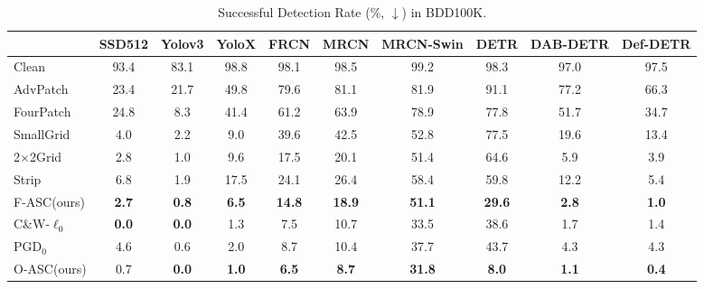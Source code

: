 \documentclass[times,twocolumn,final,authoryear]{elsarticle}
\begin{document}
\begin{table*}[!h]
\centering
\caption{Successful Detection Rate (\%, $\downarrow$) in BDD100K. 
}
\begin{tabular}{l|ccccccccc}
\hline
   & SSD512 & Yolov3 & YoloX & FRCN & MRCN & MRCN-Swin & DETR  & DAB-DETR & Def-DETR \\ \hline
Clean    
& 93.4   
& 83.1   & 98.8  & 98.1 & 98.5 & 99.2& 98.3  & 97.0  & 97.5   \\ \hline
AdvPatch 
& 23.4   & 21.7   & 49.8  & 79.6 & 81.1 & 81.9& 91.1 & 77.2   & 66.3   \\
FourPatch
& 24.8   & 8.3    & 41.4  & 61.2 & 63.9 & 78.9& 77.8 & 51.7  & 34.7     \\
SmallGrid
& 4.0    & 2.2    & 9.0   & 39.6 & 42.5 & 52.8& 77.5  & 19.6  & 13.4   \\
2$\times$2Grid 
& 2.8    & 1.0    & 9.6   & 17.5 & 20.1 & 51.4& 64.6  & 5.9 & 3.9 \\
Strip    
& 6.8    & 1.9    & 17.5  & 24.1 & 26.4 & 58.4& 59.8  & 12.2  & 5.4   \\
F-ASC(ours)    
& \textbf{2.7}    & \textbf{0.8}    & \textbf{6.5}   & \textbf{14.8} & \textbf{18.9} & \textbf{51.1} & \textbf{29.6}  & \textbf{2.8} & \textbf{1.0} \\ \hline \hline
C\&W-$\ell_0$  
& \textbf{0.0}    & \textbf{0.0}    & 1.3   & 7.5  & 10.7 & 33.5& 38.6 & 1.7 & 1.4\\
PGD$_0$  
& 4.6    & 0.6    & 2.0   & 8.7  & 10.4 & 37.7& 43.7 & 4.3 & 4.3 \\
O-ASC(ours)    
& 0.7    & \textbf{0.0}    & \textbf{1.0}   & \textbf{6.5}  & \textbf{8.7}  & \textbf{31.8} & \textbf{8.0}   & \textbf{1.1} & \textbf{0.4} \\ \hline
\end{tabular}
\label{tab:bdd100k}
\end{table*}
\end{document}
